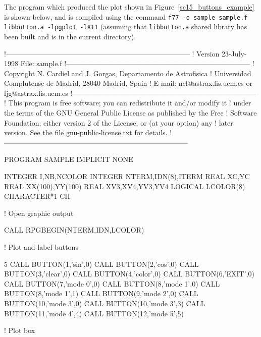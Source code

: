 \documentclass[twoside,11pt]{starlink}
\begin{document}

The program which produced the plot shown in
Figure~\ref{sc15_buttons_example} is shown below, and is compiled
using the command \texttt{f77 -o sample sample.f libbutton.a -lpgplot
-lX11} (assuming that \texttt{libbutton.a} shared library has been built
and is in the current directory).

\begin{small}
\begin{terminalv}
!------------------------------------------------------------------------------
! Version 23-July-1998                                           File: sample.f
!------------------------------------------------------------------------------
! Copyright N. Cardiel and J. Gorgas, Departamento de Astrofisica
! Universidad Complutense de Madrid, 28040-Madrid, Spain
! E-mail: ncl@astrax.fis.ucm.es or fjg@astrax.fis.ucm.es
!------------------------------------------------------------------------------
! This program is free software; you can redistribute it and/or modify it
! under the terms of the GNU General Public License as published by the Free
! Software Foundation; either version 2 of the License, or (at your option) any
! later version. See the file gnu-public-license.txt for details.
!------------------------------------------------------------------------------

       PROGRAM SAMPLE
       IMPLICIT NONE

       INTEGER I,NB,NCOLOR
       INTEGER NTERM,IDN(8),ITERM
       REAL XC,YC
       REAL XX(100),YY(100)
       REAL XV3,XV4,YV3,YV4
       LOGICAL LCOLOR(8)
       CHARACTER*1 CH

! Open graphic output

       CALL RPGBEGIN(NTERM,IDN,LCOLOR)

! Plot and label buttons

5      CALL BUTTON(1,'sin',0)
       CALL BUTTON(2,'cos',0)
       CALL BUTTON(3,'clear',0)
       CALL BUTTON(4,'color',0)
       CALL BUTTON(6,'EXIT',0)
       CALL BUTTON(7,'mode 0',0)
       CALL BUTTON(8,'mode 1',0)
       CALL BUTTON(8,'mode 1',1)
       CALL BUTTON(9,'mode 2',0)
       CALL BUTTON(10,'mode 3',0)
       CALL BUTTON(10,'mode 3',3)
       CALL BUTTON(11,'mode 4',4)
       CALL BUTTON(12,'mode 5',5)

! Plot box


\end{terminalv}
\end{small}
\end{document}
